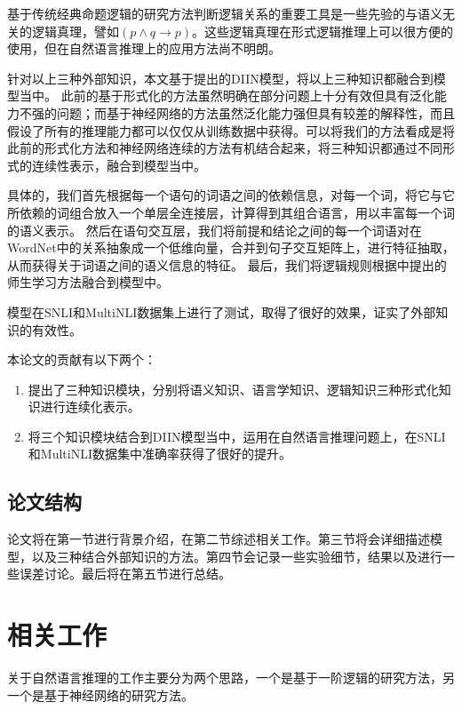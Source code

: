 \documentclass[UTF8,11pt,a4paper,nofonts]{ctexart}
\begin{document}
基于传统经典命题逻辑的研究方法判断逻辑关系的重要工具是一些先验的与语义无关的逻辑真理，譬如$(p\land q \to p)$。这些逻辑真理在形式逻辑推理上可以很方便的使用，但在自然语言推理上的应用方法尚不明朗。

针对以上三种外部知识，本文基于\cite{yichen2018nli}提出的DIIN模型，将以上三种知识都融合到模型当中。
此前的基于形式化的方法虽然明确在部分问题上十分有效但具有泛化能力不强的问题；而基于神经网络的方法虽然泛化能力强但具有较差的解释性，而且假设了所有的推理能力都可以仅仅从训练数据中获得。可以将我们的方法看成是将此前的形式化方法和神经网络连续的方法有机结合起来，将三种知识都通过不同形式的连续性表示，融合到模型当中。

具体的，我们首先根据每一个语句的词语之间的依赖信息，对每一个词，将它与它所依赖的词组合放入一个单层全连接层，计算得到其组合语言，用以丰富每一个词的语义表示。
然后在语句交互层，我们将前提和结论之间的每一个词语对在WordNet中的关系抽象成一个低维向量，合并到句子交互矩阵上，进行特征抽取，从而获得关于词语之间的语义信息的特征。
最后，我们将逻辑规则根据\cite{Hu2016HarnessingDN}中提出的师生学习方法融合到模型中。

模型在SNLI和MultiNLI数据集上进行了测试，取得了很好的效果，证实了外部知识的有效性。

本论文的贡献有以下两个：

\begin{enumerate}
\item 提出了三种知识模块，分别将语义知识、语言学知识、逻辑知识三种形式化知识进行连续化表示。
\item 将三个知识模块结合到DIIN模型当中，运用在自然语言推理问题上，在SNLI和MultiNLI数据集中准确率获得了很好的提升。
\end{enumerate}



\subsection{论文结构}

论文将在第一节进行背景介绍，在第二节综述相关工作。第三节将会详细描述模型，以及三种结合外部知识的方法。第四节会记录一些实验细节，结果以及进行一些误差讨论。最后将在第五节进行总结。

\newpage
\section{相关工作}

关于自然语言推理的工作主要分为两个思路，一个是基于一阶逻辑的研究方法，另一个是基于神经网络的研究方法。
\end{document}

